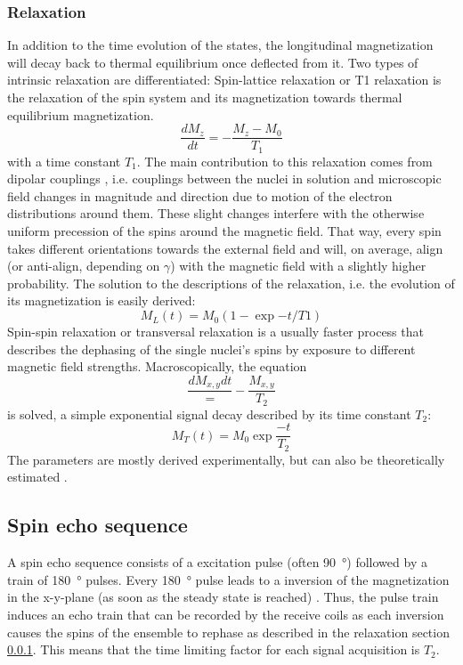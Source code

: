         \subsubsection{Relaxation}
        \label{section:theory:relaxation}
        In addition to the time evolution of the states, the longitudinal magnetization will decay back to thermal equilibrium once deflected from it. Two types of intrinsic relaxation are differentiated:
        Spin-lattice relaxation or T1 relaxation is the relaxation of the spin system and its magnetization towards thermal equilibrium magnetization. 
        \begin{equation}
            \frac{dM_z}{dt}= -\frac{M_z-M_0}{T_1}
        \end{equation}
        with a time constant $T_1$. The main contribution to this relaxation comes from dipolar couplings \cite{levitt_spin_nodate}, i.e. couplings between the nuclei in solution and microscopic field changes in magnitude and direction due to motion of the electron distributions around them. These slight changes interfere with the otherwise uniform precession of the spins around the magnetic field. That way, every spin takes different orientations towards the external field and will, on average, align (or anti-align, depending on $\gamma$) with the magnetic field with a slightly higher probability. The solution to the descriptions of the relaxation, i.e. the  evolution of its magnetization is easily derived:
        \begin{equation}
            M_L(t) = M_0(1 - \exp{-t/T1})
        \end{equation}
        Spin-spin relaxation or transversal relaxation is a usually faster process that describes the dephasing of the single nuclei's spins by exposure to different magnetic field strengths. Macroscopically, the equation
        \begin{equation}
        \frac{dM_{x,y}{dt}} = - \frac{M_{x,y}}{T_2}
        \end{equation}
        is solved, a simple exponential signal decay described by its time constant $T_2$:
        \begin{equation}
            M_T(t) = M_0\exp{\frac{-t}{T_2}}
        \end{equation}
        The parameters are mostly derived experimentally, but can also be theoretically estimated \cite{kaupp_calculation_2003}.
        \subsection{Spin echo sequence}
        A spin echo sequence consists of a excitation pulse (often \SI{90}{\degree}) followed by a train of \SI{180}{\degree} pulses. Every 180\SI{}{\degree} pulse leads to a inversion of the magnetization in the x-y-plane (as soon as the steady state is reached) \cite{brown_mri_2005}. Thus, the pulse train induces an echo train that can be recorded by the receive coils as each inversion causes the spins of the ensemble to rephase as described in the relaxation section \ref{section:theory:relaxation}. This means that the time limiting factor for each signal acquisition is $T_2$. 

